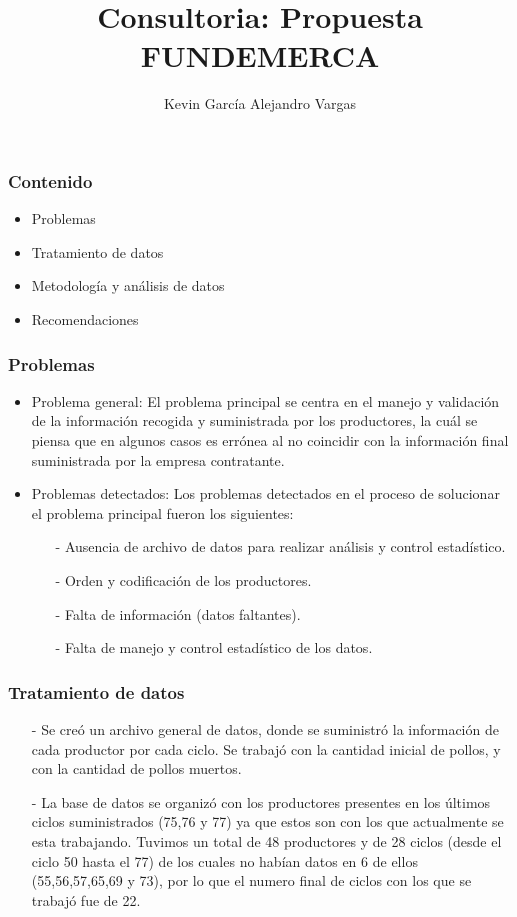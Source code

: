 \documentclass[11pt]{beamer}
\author[Kevin García - Alejandro Vargas]{Kevin García \newline Alejandro Vargas }
\title[Consultoria]{Consultoria: Propuesta FUNDEMERCA}
\begin{document}
\justifying


\begin{frame}
\titlepage
\end{frame}


\begin{frame}
\frametitle{Contenido}
\begin{itemize}
\item Problemas
\item Tratamiento de datos
\item Metodología y análisis de datos
\item Recomendaciones
\end{itemize}
\end{frame}

\begin{frame}
\frametitle{Problemas}
\begin{itemize}
\justifying
\item Problema general: El problema principal se centra en el manejo y validación de la información recogida y suministrada por los productores, la cuál se piensa que en algunos casos es errónea al no coincidir con la información final suministrada por la empresa contratante.
\item Problemas detectados: Los problemas detectados en el proceso de solucionar el problema principal fueron los siguientes:
\begin{itemize}
\item[-]Ausencia de archivo de datos para realizar análisis y control estadístico.
\item[-]Orden y codificación de los productores.
\item[-]Falta de información (datos faltantes).
\item[-]Falta de manejo y control estadístico de los datos.
\end{itemize}
\end{itemize}
\end{frame}

\begin{frame}
\frametitle{Tratamiento de datos}
\begin{itemize}
\justifying
\item[-]Se creó un archivo general de datos, donde se suministró la información de cada productor por cada ciclo. Se trabajó con la cantidad inicial de pollos, y con la cantidad de pollos muertos.
\item[-]La base de datos se organizó con los productores presentes en los últimos ciclos suministrados (75,76 y 77) ya que estos son con los que actualmente se esta trabajando. Tuvimos un total de 48 productores y de 28 ciclos (desde el ciclo 50 hasta el 77) de los cuales no habían datos en 6 de ellos (55,56,57,65,69 y 73), por lo que el numero final de ciclos con los que se trabajó fue de 22.
\end{itemize}
\end{frame}
\end{document}
